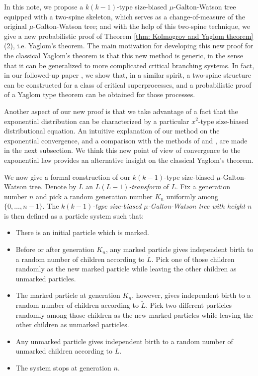 \documentclass[12pt,a4paper]{amsart}
\numberwithin{equation}{section}
\begin{document}
	In this note, we propose a $k(k-1)$-type size-biased $\mu$-Galton-Watson tree equipped with a two-spine skeleton, which serves as a change-of-measure of the original $\mu$-Galton-Watson tree;
	and with the help of this two-spine technique, we give a new probabilistic proof of Theorem \ref{thm: Kolmogrov and Yaglom theorem}(2), i.e. Yaglom's theorem.
	The main motivation for developing this new proof for the classical Yaglom's theorem is that this new method is generic, in the sense that it can be generalized to more complicated critical branching systems.
	In fact, in our followed-up paper \cite{RenSongSun2017Spine}, we show that, in a similar spirit, a two-spine structure can be constructed for a class of critical superprocesses, and a probabilistic proof of a Yaglom type theorem can be obtained for those processes.



	Another aspect of our new proof is that we take advantage of a fact that the exponential distribution can be characterized by a particular $x^2$-type size-biased distributional equation.
	An intuitive explanation of our method on the exponential convergence, and a comparison with the methods of \cite{geiger2000new} and \cite{lyons1995conceptual}, are
	made in the next subsection.
	We think this new point of view of convergence to the exponential law provides an alternative insight on the classical Yaglom's theorem.

	We now give a formal construction of our $k(k-1)$-type size-biased $\mu$-Galton-Watson tree.
	Denote by $\ddot L$ an \emph{$L(L-1)$-transform} of $L$.
	Fix a generation number $n$ and pick a random generation number $K_n$ uniformly among $\{0,\dots,n-1\}$.
	The \emph{$k(k-1)$-type size-biased $\mu$-Galton-Watson tree with height $n$} is then defined as a particle system such that:
\begin{itemize}
\item
	There is an initial particle which is marked.
\item
	Before or after generation $K_n$, any marked particle gives independent birth to a random number of children according to $\dot L$.
	Pick one of those children randomly as the new marked particle while leaving the other children as unmarked particles.
\item
	The marked particle at generation $K_n$, however, gives independent birth to a random number of children according to $\ddot L$.
	Pick two different particles randomly among those children as the new marked particles while leaving the other children as unmarked particles.
\item
	Any unmarked particle gives independent birth to a random number of unmarked children according to $L$.
\item
	The system stops at generation $n$.
\end{itemize}
\end{document}
